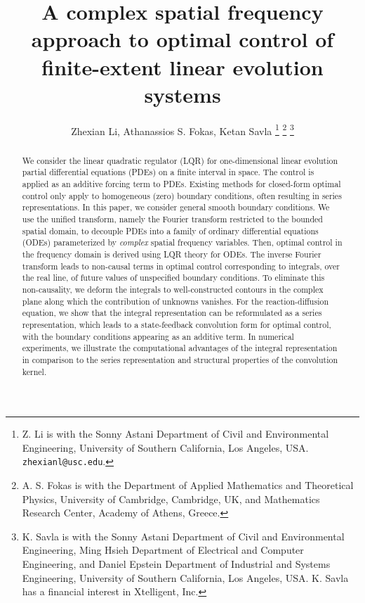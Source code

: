 \documentclass[journal,twoside,web]{ieeecolor}
\begin{document}
\title{A complex spatial frequency approach to optimal control of finite-extent linear evolution systems}%
\author{Zhexian Li, Athanassios S. Fokas, Ketan Savla \thanks{Z. Li is with the Sonny Astani Department of Civil and Environmental Engineering, University of Southern California, Los Angeles, USA. \texttt{zhexianl@usc.edu}. 
}
\thanks{
	A. S. Fokas is with the Department of Applied Mathematics and Theoretical Physics, University of Cambridge, Cambridge, UK, and Mathematics Research Center, Academy of Athens, Greece.
} 
\thanks{
	K. Savla is with the Sonny Astani Department of Civil and Environmental Engineering, Ming Hsieh Department of Electrical and Computer Engineering, and Daniel Epstein Department of Industrial and Systems Engineering, University of Southern California, Los Angeles, USA. K. Savla has a financial interest in Xtelligent, Inc.
}
}

  
\maketitle

\begin{abstract}
We consider the linear quadratic regulator (LQR) for one-dimensional linear evolution partial differential equations (PDEs) on a finite interval in space. 
The control is applied as an additive forcing term to PDEs.
Existing methods for closed-form optimal control only apply to homogeneous (zero) boundary conditions, often resulting in series representations. 
In this paper, we consider general smooth boundary conditions.
We use the unified transform, namely the Fourier transform restricted to the bounded spatial domain, to decouple PDEs into a family of ordinary differential equations (ODEs) parameterized by \emph{complex} spatial frequency variables.
Then, optimal control in the frequency domain is derived using LQR theory for ODEs.
The inverse Fourier transform leads to non-causal terms in optimal control corresponding to integrals, over the real line, of future values of unspecified boundary conditions. 
To eliminate this non-causality, we deform the integrals to well-constructed contours in the complex plane along which the contribution of unknowns vanishes.
For the reaction-diffusion equation, we show that the integral representation can be reformulated as a series representation, which leads to a state-feedback convolution form for optimal control, with the boundary conditions appearing as an additive term.
In numerical experiments,
we illustrate the computational advantages of the integral representation in comparison to the series representation and structural properties of the convolution kernel.
\end{abstract}
\end{document}
